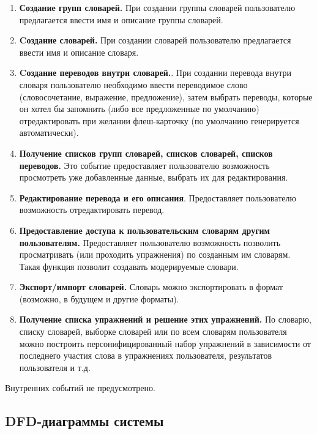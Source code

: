 \documentclass[a4paper,14pt]{extarticle}
\begin{document}
\begin{enumerate}
    \item \textbf{Создание групп словарей.} При создании группы
          словарей пользователю предлагается ввести имя и описание группы
          словарей.
    \item \textbf{Cоздание словарей.} При создании словарей пользователю
          предлагается ввести имя и описание словаря.
    \item \textbf{Cоздание переводов внутри словарей.}. При создании перевода
          внутри словаря пользователю необходимо ввести переводимое слово
          (словосочетание, выражение, предложение), затем выбрать переводы,
          которые он хотел бы запомнить (либо все предложенные по умолчанию)
          отредактировать при желании флеш-карточку (по умолчанию генерируется
          автоматически).
    \item \textbf{Получение списков групп словарей, списков словарей, списков
          переводов.} Это событие предоставляет пользователю возможность
          просмотреть уже добавленные данные, выбрать их для редактирования.
    \item \textbf{Редактирование перевода и его описания}. Предоставляет
          пользователю возможность отредактировать перевод.
    \item \textbf{Предоставление доступа к пользовательским словарям другим
          пользователям.} Предоставляет пользователю возможность позволить
          просматривать (или проходить упражнения) по созданным им словарям.
          Такая функция позволит создавать модерируемые словари.
    \item \textbf{Экспорт/импорт словарей.} Словарь можно экспортировать в
          формат  (возможно, в будущем и другие форматы).
    \item \textbf{Получение списка упражнений и решение этих упражнений.} По
          словарю, списку словарей, выборке словарей или по всем словарям
          пользователя можно построить персонифицированный набор упражнений в
          зависимости от последнего участия слова в упражнениях пользователя,
          результатов пользователя и т.д.
\end{enumerate}

Внутренних событий не предусмотрено.

\subsection{DFD-диаграммы системы}
\end{document}
